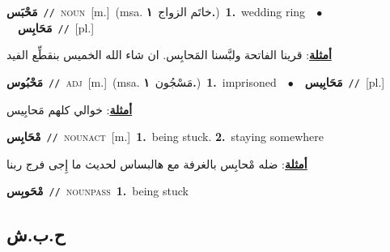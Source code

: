 \documentclass[10pt,a4paper,twoside]{article} %
\begin{document}
\begin{multicols}{2}
{{{{\setlength\topsep{0pt}\textbf{\foreignlanguage{arabic}{مَحْبَس}}\ {\color{gray}\texttt{//}\color{black}}\ \textsc{noun}\ [m.]\ \color{gray}(msa. \foreignlanguage{arabic}{خاتَم الزواج}~\foreignlanguage{arabic}{\textbf{١.}})\color{black}\ \textbf{1.}~wedding ring\ \ $\bullet$\ \ \setlength\topsep{0pt}\textbf{\foreignlanguage{arabic}{مَحَابِس}}\ {\color{gray}\texttt{//}\color{black}}\ [pl.]\  \begin{flushright}\color{gray}\foreignlanguage{arabic}{\textbf{\underline{\foreignlanguage{arabic}{أمثلة}}}: قرينا الفاتحة ولبَّسنا المَحابِس. ان شاء الله الخميس بنقطِّع الفيد}\end{flushright}\color{black}} \vspace{2mm}

{\setlength\topsep{0pt}\textbf{\foreignlanguage{arabic}{مَحْبُوس}}\ {\color{gray}\texttt{//}\color{black}}\ \textsc{adj}\ [m.]\ \color{gray}(msa. \foreignlanguage{arabic}{مَسْجُون}~\foreignlanguage{arabic}{\textbf{١.}})\color{black}\ \textbf{1.}~imprisoned\ \ $\bullet$\ \ \setlength\topsep{0pt}\textbf{\foreignlanguage{arabic}{مَحَابِيس}}\ {\color{gray}\texttt{//}\color{black}}\ [pl.]\  \begin{flushright}\color{gray}\foreignlanguage{arabic}{\textbf{\underline{\foreignlanguage{arabic}{أمثلة}}}: خوالي كلهم مَحابِيس}\end{flushright}\color{black}} \vspace{2mm}

{\setlength\topsep{0pt}\textbf{\foreignlanguage{arabic}{مْحَابِس}}\ {\color{gray}\texttt{//}\color{black}}\ \textsc{noun\textunderscore act}\ [m.]\ \textbf{1.}~being stuck.  \textbf{2.}~staying somewhere\  \begin{flushright}\color{gray}\foreignlanguage{arabic}{\textbf{\underline{\foreignlanguage{arabic}{أمثلة}}}: ضله مْحابِس بالغرفة مع هالبساس لحديث ما إِجى فرج ربنا}\end{flushright}\color{black}} \vspace{2mm}

{\setlength\topsep{0pt}\textbf{\foreignlanguage{arabic}{مْحَوبِس}}\ {\color{gray}\texttt{//}\color{black}}\ \textsc{noun\textunderscore pass}\ \textbf{1.}~being stuck\ 

\vspace{-3mm}
\subsection*{\color{blue}\foreignlanguage{arabic}{ح.ب.ش}\color{blue}{}} 

}}}}
\end{multicols}
\end{document}
